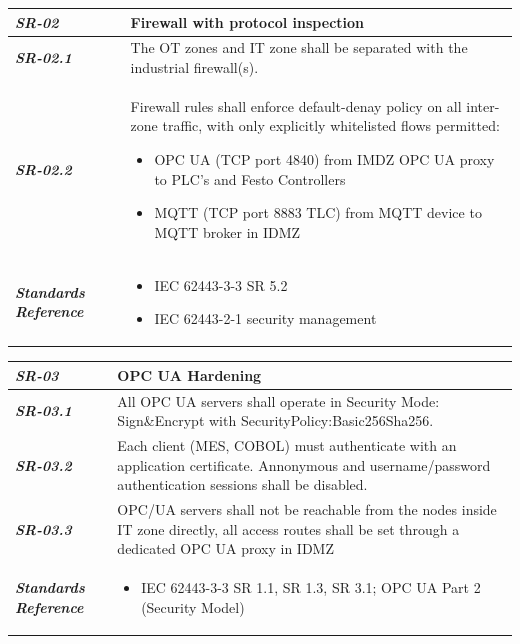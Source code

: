 \begin{tabularx}{\textwidth}{>{\bfseries}p{2.5cm} X}
    \textit{SR-02} & \textbf{Firewall with protocol inspection} \vspace{0.5em}\\
\toprule
\textit{SR-02.1} &
    The OT zones and IT zone shall be separated with the industrial firewall(s).
    \vspace{0.5em}
\\
\textit{SR-02.2} &
Firewall rules shall enforce default-denay policy on all inter-zone traffic,
with only explicitly whitelisted flows permitted:
\begin{itemize}[label=-, itemsep=0pt, topsep=2pt]
    \item OPC UA (TCP port 4840) from IMDZ OPC UA proxy to PLC's and Festo Controllers
    \item MQTT (TCP port 8883 TLC) from MQTT device to MQTT broker in IDMZ
\end{itemize} \vspace{1em}
    \\
\midrule
    \textit{Standards Reference} &
\begin{itemize}[label=-, noitemsep, topsep=0pt, leftmargin=*]
    \item IEC 62443-3-3 SR 5.2
    \item IEC 62443-2-1 security management
\end{itemize} \vspace{1em} \\ 
\end{tabularx}
\vspace{2em}

\begin{tabularx}{\textwidth}{>{\bfseries}p{2.5cm} X}
    \textit{SR-03} & \textbf{OPC UA Hardening} \vspace{0.5em}\\
\toprule
\textit{SR-03.1} &
    
    All OPC UA servers shall operate in Security Mode: Sign\&Encrypt with SecurityPolicy:Basic256Sha256.
    \vspace{0.5em}
\\
\textit{SR-03.2} &
    Each client (MES, COBOL) must authenticate with an application certificate. Annonymous and username/password authentication sessions shall be disabled.
    \vspace{0.5em}
    \\
\textit{SR-03.3} &
    OPC/UA servers shall not be reachable from the nodes inside IT zone directly, all access routes shall be set through a dedicated OPC UA proxy in IDMZ
    \vspace{0.5em}
    \\
\midrule
    \textit{Standards Reference} &
\begin{itemize}[label=-, noitemsep, topsep=0pt, leftmargin=*]
    \item IEC 62443-3-3 SR 1.1, SR 1.3, SR 3.1; OPC UA Part 2 (Security Model)
\end{itemize} \vspace{1em} \\ 
\end{tabularx}
\vspace{2em}

